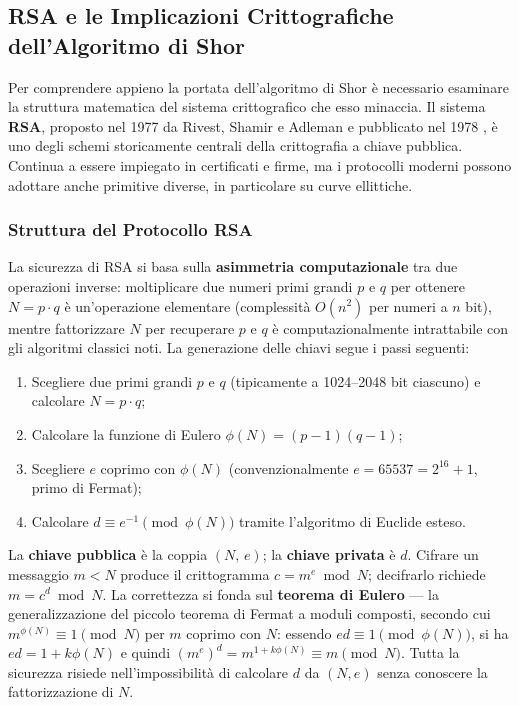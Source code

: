 \begin{onehalfspace}
\subsection{RSA e le Implicazioni Crittografiche dell'Algoritmo di Shor}
\label{app:intro:rsa}

Per comprendere appieno la portata dell'algoritmo di Shor è necessario esaminare la struttura matematica del sistema crittografico che esso minaccia. Il sistema \textbf{RSA}, proposto nel 1977 da Rivest, Shamir e Adleman e pubblicato nel 1978 \cite{rsa1978}, è uno degli schemi storicamente centrali della crittografia a chiave pubblica. Continua a essere impiegato in certificati e firme, ma i protocolli moderni possono adottare anche primitive diverse, in particolare su curve ellittiche.

\subsubsection{Struttura del Protocollo RSA}

La sicurezza di RSA si basa sulla \textbf{asimmetria computazionale} tra due operazioni inverse: moltiplicare due numeri primi grandi $p$ e $q$ per ottenere $N = p \cdot q$ è un'operazione elementare (complessità $O(n^2)$ per numeri a $n$ bit), mentre fattorizzare $N$ per recuperare $p$ e $q$ è computazionalmente intrattabile con gli algoritmi classici noti. La generazione delle chiavi segue i passi seguenti:

\begin{enumerate}
    \item Scegliere due primi grandi $p$ e $q$ (tipicamente a 1024--2048 bit ciascuno) e calcolare $N = p \cdot q$;
    \item Calcolare la funzione di Eulero $\phi(N) = (p-1)(q-1)$;
    \item Scegliere $e$ coprimo con $\phi(N)$ (convenzionalmente $e = 65537 = 2^{16}+1$, primo di Fermat);
    \item Calcolare $d \equiv e^{-1} \pmod{\phi(N)}$ tramite l'algoritmo di Euclide esteso.
\end{enumerate}

La \textbf{chiave pubblica} è la coppia $(N,\, e)$; la \textbf{chiave privata} è $d$. Cifrare un messaggio $m < N$ produce il crittogramma $c = m^e \bmod N$; decifrarlo richiede $m = c^d \bmod N$. La correttezza si fonda sul \textbf{teorema di Eulero} --- la generalizzazione del piccolo teorema di Fermat a moduli composti, secondo cui $m^{\phi(N)} \equiv 1 \pmod{N}$ per $m$ coprimo con $N$: essendo $ed \equiv 1 \pmod{\phi(N)}$, si ha $ed = 1 + k\phi(N)$ e quindi $(m^e)^d = m^{1+k\phi(N)} \equiv m \pmod{N}$. Tutta la sicurezza risiede nell'impossibilità di calcolare $d$ da $(N, e)$ senza conoscere la fattorizzazione di $N$.


\end{onehalfspace}
